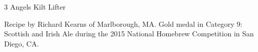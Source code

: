 \stylesection{\styleweeheavy}

\begin{recipe}{3 Angels Kilt Lifter} %

\begin{aboutblock}
Recipe by Richard Kearns of Marlborough, MA. Gold medal in Category 9: Scottish
and Irish Ale during the 2015 National Homebrew Competition in San Diego, CA.
\sourceaha
\end{aboutblock}


\begin{methodandtiming}

\begin{mashsteps}
\end{mashsteps}

\begin{fermentationsteps}
\end{fermentationsteps}

\end{methodandtiming}

\recipebreak

\begin{ingredientsblock}

\begin{malts}
\end{malts}

\begin{hops}
\end{hops}


\end{ingredientsblock}

\end{recipe}

